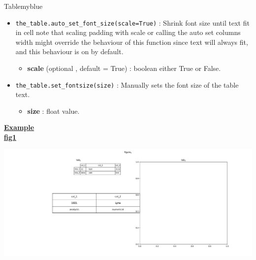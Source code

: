 \begin{prettyBox}{Table}{myblue}
\begin{itemize}
    \item \texttt{the\_table.auto\_set\_font\_size(scale=True)} :  
        Shrink font size until text fit in cell note that scaling padding with scale or calling the auto set columns width might override the behaviour
        of this function since text will always fit, and this behaviour is on by default.  
\begin{itemize}
    \item \textbf{scale} (optional , default = True) : boolean either True or False.
\end{itemize}

    \item \texttt{the\_table.set\_fontsize(size)} :  
        Manually sets the font size of the table text.
    \begin{itemize}
        \item \textbf{size} : float value. 
    \end{itemize}
   \end{itemize}
\end{prettyBox}

\newpage
\textbf{\underline{Example}}\\[0.1cm]


\vspace{0.5cm}
\textbf{\underline{fig1}}\\[0.1cm]
\begin{center}
    \includegraphics[height=0.35\textheight]{Chapters/Code/PLT/tab.pdf}
\end{center}



